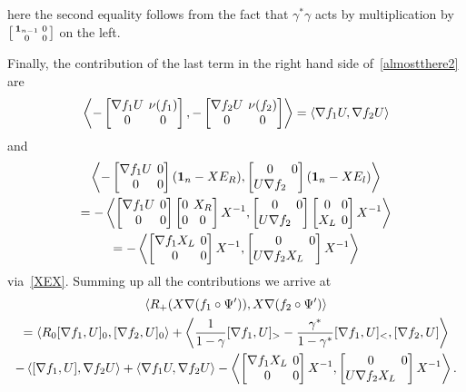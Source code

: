 \documentclass{amsart}
\theoremstyle{definition}
\theoremstyle{remark}
\numberwithin{equation}{section}
\numberwithin{theorem}{section}
\def\nablac{{\nabla}}
\def\nar{\setlength\arraycolsep{2pt}}
\def\one{\mathbf 1}
\begin{document}
here the second equality follows from the fact that
$\gamma^*\gamma$ acts by multiplication by 
$\left[\begin{smallmatrix} \one_{n-1}&0\cr 0&0\end{smallmatrix}\right]$ on the left. 

Finally, the contribution of the last term in the right hand side of~\eqref{almostthere2} are
\[
\left\langle -\nar\begin{bmatrix}\nablac f_1 U&\nu(f_1)\cr 0 & 0\end{bmatrix}, 
-\nar\begin{bmatrix}\nablac f_2 U&\nu(f_2)\cr 0 & 0\end{bmatrix}\right\rangle=
\left\langle \nablac f_1 U, \nablac f_2 U\right\rangle
\]
and
\begin{multline*}
\left\langle -\nar \begin{bmatrix}\nablac f_1 U&0\cr 0 & 0\end{bmatrix}(\one_n-XE_R),
 \begin{bmatrix}0&0\cr U\nablac f_2\end{bmatrix}(\one_n-XE_l)\right\rangle\\=
-\left\langle \nar \begin{bmatrix}\nablac f_1 U&0\cr 0 & 0\end{bmatrix}\begin{bmatrix}0& X_R \cr 0& 0\end{bmatrix}X^{-1},
\begin{bmatrix}0&0\cr U\nablac f_2 \end{bmatrix}\begin{bmatrix}0& 0\cr X_L& 0 \end{bmatrix}X^{-1}\right\rangle\\=
-\left\langle \nar \begin{bmatrix}\nablac f_1 X_L&0\cr 0 & 0\end{bmatrix}X^{-1},
\begin{bmatrix}0&0\cr U\nablac f_2X_L \end{bmatrix}X^{-1}\right\rangle
\end{multline*}
via~\eqref{XEX}. Summing up all the contributions we arrive at
\begin{multline}\label{CGpart}
\left\langle  R_+(X\nabla(f_1\circ\Psi') ),X\nabla(f_2\circ\Psi') \right\rangle\\=
\left\langle R_0[\nablac f_1, U]_0,[\nablac f_2, U]_0\right\rangle+
\left\langle \frac1{1-\gamma}[\nablac f_1, U]_>-\frac{\gamma^*}{1-\gamma^*}[\nablac f_1, U]_<,[\nablac f_2, U]\right\rangle\\-
\left\langle  [\nablac f_1, U],\nablac f_2 U\right\rangle+\left\langle \nablac f_1 U, \nablac f_2 U\right\rangle-
\left\langle \nar \begin{bmatrix}\nablac f_1 X_L&0\cr 0 & 0\end{bmatrix}X^{-1},
\begin{bmatrix}0&0\cr U\nablac f_2X_L \end{bmatrix}X^{-1}\right\rangle.
\end{multline}
\end{document}
